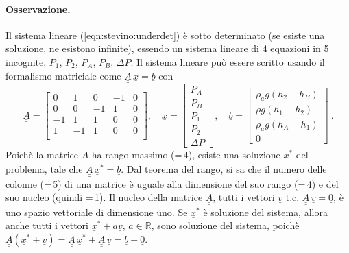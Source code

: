 \paragraph{Osservazione.} Il sistema lineare (\ref{eqn:stevino:underdet}) è sotto determinato (se esiste una soluzione, ne esistono infinite), essendo un sistema lineare di 4 equazioni in 5 incognite, $P_1$, $P_2$, $P_A$, $P_B$, $\Delta P$. Il sistema lineare può essere scritto usando il formalismo matriciale come $\underline{\underline{A}}\,\underline{x} = \underline{b}$ con
\begin{equation}
 \underline{\underline{A}} = 
\begin{bmatrix}
  0 &  1 &  0 & -1 &  0 \\
  0 &  0 & -1 &  1 &  0 \\
 -1 &  1 &  1 &  0 &  0 \\
  1 & -1 &  1 &  0 &  0 \\
\end{bmatrix} , \quad
 \underline{x} = \begin{bmatrix}
  P_A \\ P_B \\ P_1 \\ P_2 \\ \Delta P
\end{bmatrix} , \quad
 \underline{b} = \begin{bmatrix}
  \rho_a g (h_2-h_B) \\ \rho g (h_1-h_2) \\ \rho_a g (h_A-h_1) \\ 0 
\end{bmatrix} \ .
\end{equation}
Poichè la matrice $\underline{\underline{A}}$ ha rango massimo (=\,4), esiste una soluzione $\underline{x}^*$ del problema, tale che  $\underline{\underline{A}}\,\underline{x}^* = \underline{b}$. Dal teorema del rango, si sa che il numero delle colonne (=\,5) di una matrice è uguale alla dimensione del suo rango (=\,4) e del suo nucleo (quindi =\,1). Il nucleo della matrice $\underline{\underline{A}}$, tutti i vettori $\underline{v}$ t.c.  $\underline{\underline{A}}\,\underline{v} = \underline{0}$, è uno spazio vettoriale di dimensione uno.
Se $\underline{x}^*$ è soluzione del sistema, allora anche tutti i vettori $\underline{x}^* + a \underline{v}$, $a \in \mathbb{R}$, sono soluzione del sistema, poichè $\underline{\underline{A}}(\underline{x}^* + \underline{v}) = \underline{\underline{A}}\,\underline{x}^* + \underline{\underline{A}}\,\underline{v} = \underline{b} + \underline{0}$.
